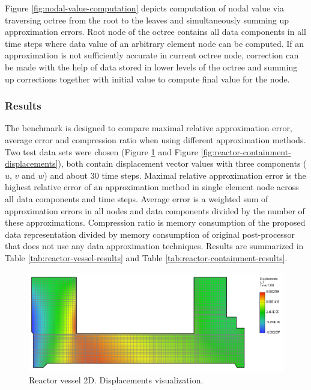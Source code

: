Figure \ref{fig:nodal-value-computation} depicts computation of nodal value via traversing octree from the root to the leaves and simultaneously summing up approximation errors. Root node of the octree contains all data components in all time steps where data value of an arbitrary element node can be computed. If an approximation is not sufficiently accurate in current octree node, correction can be made with the help of data stored in lower levels of the octree and summing up corrections together with initial value to compute final value for the node.


\subsubsection{Results}

The benchmark is designed to compare maximal relative approximation error, average error and compression ratio when using different approximation methods. Two test data sets were chosen (Figure \ref{fig:reactor-vessel-displacements} and Figure \ref{fig:reactor-containment-displacements}), both contain displacement vector values with three components ($u$, $v$ and $w$) and about 30 time steps. Maximal relative approximation error is the highest relative error of an approximation method in single element node across all data components and time steps. Average error is a weighted sum of approximation errors in all nodes and data components divided by the number of these approximations. Compression ratio is memory consumption of the proposed data representation divided by memory consumption of original post-processor that does not use any data approximation techniques. Results are summarized in Table \ref{tab:reactor-vessel-results} and Table \ref{tab:reactor-containment-results}.

\begin{figure}[H]
\centering
\includegraphics[width=\textwidth]{figures/chapter-approximation/figure7}
\decoRule
\caption[Reactor vessel 2D]{Reactor vessel 2D. Displacements visualization.}
\label{fig:reactor-vessel-displacements}
\end{figure}

